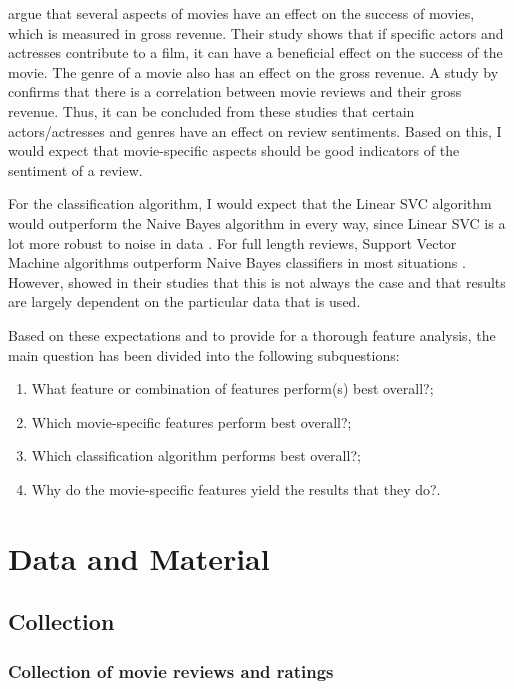 \documentclass[
10pt, %
a4paper, %
oneside, %
headinclude,footinclude, %
] {book}%
\begin{document}
\citet{simonoff2000predicting} argue that several aspects of movies have an effect on the success of movies, which is measured in gross revenue. Their study shows that if specific actors and actresses contribute to a film, it can have a beneficial effect on the success of the movie. The genre of a movie also has an effect on the gross revenue. A study by \citet{eliashberg1997film} confirms that there is a correlation between movie reviews and their gross revenue. Thus, it can be concluded from these studies that certain actors/actresses and genres have an effect on review sentiments. Based on this, I would expect that movie-specific aspects should be good indicators of the sentiment of a review.

For the classification algorithm, I would expect that the Linear SVC algorithm would outperform the Naive Bayes algorithm in every way, since Linear SVC is a lot more robust to noise in data \citep{furey2000support}. For full length reviews, Support Vector Machine algorithms outperform Naive Bayes classifiers in most situations \citep{wang2012baselines}. However, \citet{huang2003comparing} showed in their studies that this is not always the case and that results are largely dependent on the particular data that is used.

Based on these expectations and to provide for a thorough feature analysis, the main question has been divided into the following subquestions:

\begin{enumerate}
\item What feature or combination of features perform(s) best overall?;
\item Which movie-specific features perform best overall?;
\item Which classification algorithm performs best overall?;
\item Why do the movie-specific features yield the results that they do?.
\end{enumerate}

\chapter{Data and Material}

\section{Collection} 

\subsection{Collection of movie reviews and ratings}
\end{document}
